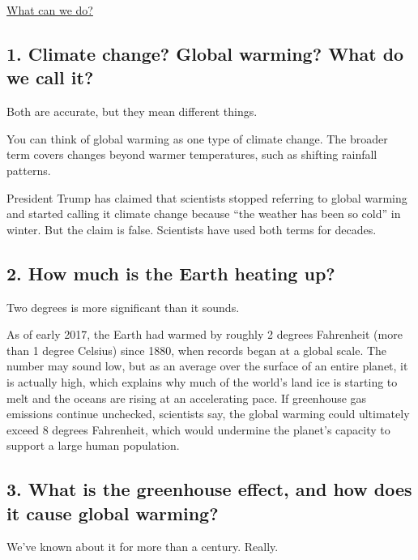 \protect\hyperlink{chapterthree}{What can we do?}

\hypertarget{1-climate-change-global-warming-what-do-we-call-it}{%
\subsection{1. Climate change? Global warming? What do we call
it?}\label{1-climate-change-global-warming-what-do-we-call-it}}

Both are accurate, but they mean different things.

You can think of global warming as one type of climate change. The
broader term covers changes beyond warmer temperatures, such as shifting
rainfall patterns.

President Trump has claimed that scientists stopped referring to global
warming and started calling it climate change because ``the weather has
been so cold'' in winter. But the claim is false. Scientists have used
both terms for decades.

\hypertarget{2-how-much-is-the-earth-heating-up}{%
\subsection{2. How much is the Earth heating
up?}\label{2-how-much-is-the-earth-heating-up}}

Two degrees is more significant than it sounds.

As of early 2017, the Earth had warmed by roughly 2 degrees Fahrenheit
(more than 1 degree Celsius) since 1880, when records began at a global
scale. The number may sound low, but as an average over the surface of
an entire planet, it is actually high, which explains why much of the
world's land ice is starting to melt and the oceans are rising at an
accelerating pace. If greenhouse gas emissions continue unchecked,
scientists say, the global warming could ultimately exceed 8 degrees
Fahrenheit, which would undermine the planet's capacity to support a
large human population.

\hypertarget{3-what-is-the-greenhouse-effect-and-how-does-it-cause-global-warming}{%
\subsection{3. What is the greenhouse effect, and how does it cause
global
warming?}\label{3-what-is-the-greenhouse-effect-and-how-does-it-cause-global-warming}}

We've known about it for more than a century. Really.

